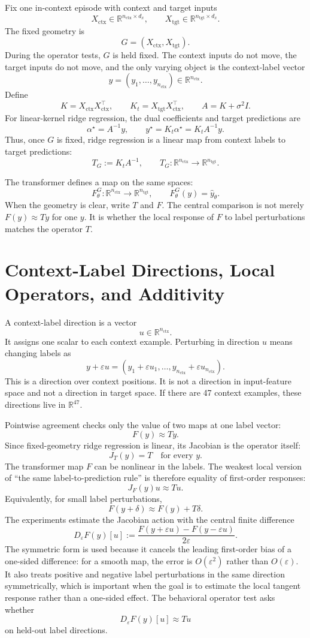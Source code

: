 \documentclass[11pt]{article}
\newcommand{\R}{\mathbb{R}}
\begin{document}
Fix one in-context episode with context and target inputs
\[
X_{\mathrm{ctx}}\in\R^{n_{\mathrm{ctx}}\times d_x},
\qquad
X_{\mathrm{tgt}}\in\R^{n_{\mathrm{tgt}}\times d_x}.
\]
The fixed geometry is
\[
G=(X_{\mathrm{ctx}},X_{\mathrm{tgt}}).
\]
During the operator tests, \(G\) is held fixed. The context inputs do not move, the target inputs do
not move, and the only varying object is the context-label vector
\[
y=(y_1,\ldots,y_{n_{\mathrm{ctx}}})\in\R^{n_{\mathrm{ctx}}}.
\]
Define
\[
K=X_{\mathrm{ctx}}X_{\mathrm{ctx}}^\top,\qquad
K_t=X_{\mathrm{tgt}}X_{\mathrm{ctx}}^\top,\qquad
A=K+\sigma^2 I.
\]
For linear-kernel ridge regression, the dual coefficients and target predictions are
\[
\alpha^\star=A^{-1}y,\qquad
y^\star=K_t\alpha^\star=K_tA^{-1}y.
\]
Thus, once \(G\) is fixed, ridge regression is a linear map from context labels to target
predictions:
\[
T_G:=K_tA^{-1},
\qquad
T_G:\R^{n_{\mathrm{ctx}}}\to\R^{n_{\mathrm{tgt}}}.
\]

The transformer defines a map on the same spaces:
\[
F_\theta^G:\R^{n_{\mathrm{ctx}}}\to\R^{n_{\mathrm{tgt}}},
\qquad
F_\theta^G(y)=\widehat y_\theta.
\]
When the geometry is clear, write \(T\) and \(F\). The central comparison is not merely
\(F(y)\approx Ty\) for one \(y\). It is whether the local response of \(F\) to label perturbations
matches the operator \(T\).

\section{Context-Label Directions, Local Operators, and Additivity}

A context-label direction is a vector
\[
u\in\R^{n_{\mathrm{ctx}}}.
\]
It assigns one scalar to each context example. Perturbing in direction \(u\) means changing labels as
\[
y+\varepsilon u
=
(y_1+\varepsilon u_1,\ldots,y_{n_{\mathrm{ctx}}}+\varepsilon u_{n_{\mathrm{ctx}}}).
\]
This is a direction over context positions. It is not a direction in input-feature space and not a
direction in target space. If there are 47 context examples, these directions live in \(\R^{47}\).

Pointwise agreement checks only the value of two maps at one label vector:
\[
F(y)\approx Ty.
\]
Since fixed-geometry ridge regression is linear, its Jacobian is the operator itself:
\[
J_T(y)=T\quad\text{for every }y.
\]
The transformer map \(F\) can be nonlinear in the labels. The weakest local version of ``the same
label-to-prediction rule'' is therefore equality of first-order responses:
\[
J_F(y)u\approx Tu.
\]
Equivalently, for small label perturbations,
\[
F(y+\delta)\approx F(y)+T\delta.
\]
The experiments estimate the Jacobian action with the central finite difference
\[
D_\varepsilon F(y)[u]
:=
\frac{F(y+\varepsilon u)-F(y-\varepsilon u)}{2\varepsilon}.
\]
The symmetric form is used because it cancels the leading first-order bias of a one-sided
difference: for a smooth map, the error is \(O(\varepsilon^2)\) rather than \(O(\varepsilon)\). It also
treats positive and negative label perturbations in the same direction symmetrically, which is
important when the goal is to estimate the local tangent response rather than a one-sided effect.
The behavioral operator test asks whether
\[
D_\varepsilon F(y)[u]\approx Tu
\]
on held-out label directions.
\end{document}
